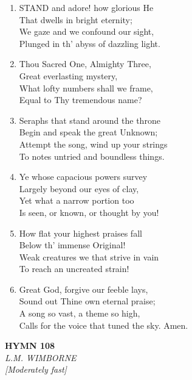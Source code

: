 \begin{enumerate}
    \item STAND and adore! how glorious He \\
        That dwells in bright eternity; \\
        We gaze and we confound our sight, \\
        Plunged in th' abyss of dazzling light.

    \item Thou Sacred One, Almighty Three, \\
        Great everlasting mystery, \\
        What lofty numbers shall we frame, \\
        Equal to Thy tremendous name?

    \item Seraphs that stand around the throne \\
        Begin and speak the great Unknown; \\
        Attempt the song, wind up your strings \\
        To notes untried and boundless things.

    \item Ye whose capacious powers survey \\
        Largely beyond our eyes of clay, \\
        Yet what a narrow portion too \\
        Is seen, or known, or thought by you!

    \item How flat your highest praises fall \\
        Below th' immense Original! \\
        Weak creatures we that strive in vain \\
        To reach an uncreated strain!

    \item Great God, forgive our feeble lays, \\
        Sound out Thine own eternal praise; \\
        A song so vast, a theme so high, \\
        Calls for the voice that tuned the sky. Amen.

\end{enumerate}

\newpage
\begin{center}
    {\Large \textbf{HYMN 108}}
    \\
    \textit{L.M. WIMBORNE}
    \\
    \textit{\small [Moderately fast]}
\end{center}
\vspace{1em}

